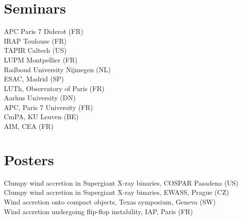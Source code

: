 \section*{Seminars}

\begin{flushleft}
\noindent{} APC Paris 7 Diderot (FR)\\
\vspace*{0.1cm}
\noindent{} IRAP Toulouse (FR)\\
\vspace*{0.1cm}
\noindent{} TAPIR Caltech (US)\\
\vspace*{0.1cm}
\noindent{} LUPM Montpellier (FR)\\
\vspace*{0.1cm}
\noindent{} Radboud University Nijmegen (NL)\\
\vspace*{0.1cm}
\noindent{} ESAC, Madrid (SP)\\
\vspace*{0.1cm}
\noindent{} LUTh, Observatory of Paris (FR)\\
\vspace*{0.1cm}
\noindent{} Aarhus University (DN)\\
\vspace*{0.1cm}
\noindent{} APC, Paris 7 University (FR)\\
\vspace*{0.1cm}
\noindent{} CmPA, KU Leuven (BE)\\
\vspace*{0.1cm}
\noindent{} AIM, CEA (FR)\\
\end{flushleft}

\section*{Posters}
       
\begin{flushleft}
\noindent{} Clumpy wind accretion in Supergiant X-ray binaries, COSPAR Pasadena (US)\\
\vspace*{0.1cm}
\noindent{} Clumpy wind accretion in Supergiant X-ray binaries, EWASS, Prague (CZ)\\
\vspace*{0.1cm}
\noindent{} Wind accretion onto compact objects, Texas symposium, Geneva (SW)\\
\vspace*{0.1cm}
\noindent{} Wind accretion undergoing flip-flop instability, IAP, Paris (FR)\\

\end{flushleft}

